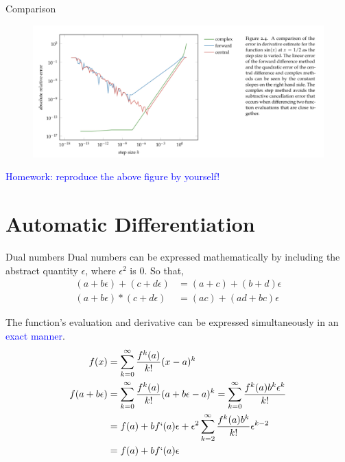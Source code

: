 \documentclass{beamer}
\begin{document}
\begin{frame}{Comparison}

\begin{figure}
\centering
\includegraphics[width=120mm]{Figs/derivative-comparison.jpeg}
\end{figure}

\textcolor{blue}{Homework: reproduce the above figure by yourself!}
\end{frame}


\section{Automatic Differentiation}
\begin{frame}{Dual numbers}
Dual numbers can be expressed mathematically by including the abstract quantity $\epsilon$, where $\epsilon^2$ is 0. So that,
\begin{equation*}
\begin{split}
    (a+b\epsilon)+(c+d\epsilon) &= (a+c) + (b+d)\epsilon\\
    (a+b\epsilon)*(c+d\epsilon) &= (ac) + (ad+bc)\epsilon
\end{split}
\end{equation*}

The function's evaluation and derivative can be expressed simultaneously in an \textcolor{blue}{exact manner}.
\begin{equation*}
\begin{split}
    f(x) &= \sum_{k=0}^\infty \frac{f^k(a)}{k!}(x-a)^k \\
    f(a+b\epsilon) &= \sum_{k=0}^\infty \frac{f^k(a)}{k!}(a+b\epsilon-a)^k
    = \sum_{k=0}^\infty \frac{f^k(a)b^k\epsilon^k}{k!}\\
    &= f(a) + bf`(a)\epsilon + \epsilon^2 \sum_{k=2}^\infty \frac{f^k(a)b^k}{k!}\epsilon^{k-2}\\
    &= f(a) + bf`(a)\epsilon
\end{split}
\end{equation*}

\end{frame}
\end{document}
